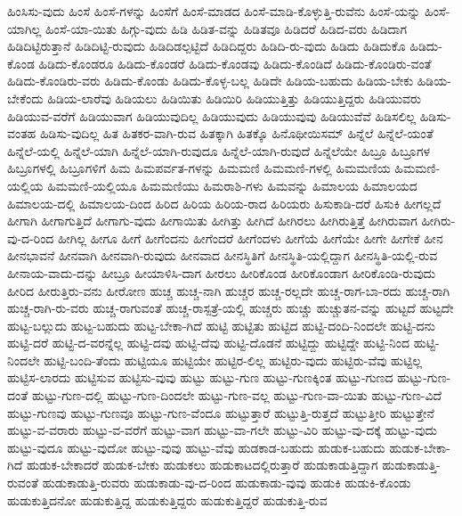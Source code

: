 {ಹಿಂಸಿಸು-ವುದು
ಹಿಂಸೆ
ಹಿಂಸೆ-ಗಳನ್ನು
ಹಿಂಸೆಗೆ
ಹಿಂಸೆ-ಮಾಡದ
ಹಿಂಸೆ-ಮಾಡಿ-ಕೊಳ್ಳುತ್ತಿ-ರುವೆನು
ಹಿಂಸೆ-ಯನ್ನು
ಹಿಂಸೆ-ಯಾಗಿಲ್ಲ
ಹಿಂಸೆ-ಯಾ-ಯಿತು
ಹಿಗ್ಗು-ವುದು
ಹಿಡಿ
ಹಿಡಿತ-ವನ್ನು
ಹಿಡಿತವೂ
ಹಿಡಿದರೆ
ಹಿಡಿದ-ವರು
ಹಿಡಿದಾಗ
ಹಿಡಿದಿಟ್ಟಿರುತ್ತಾನೆ
ಹಿಡಿದಿಟ್ಟಿ-ರುವುದು
ಹಿಡಿದಿಡಲ್ಪಟ್ಟಿದೆ
ಹಿಡಿದಿದ್ದರು
ಹಿಡಿದಿ-ರು-ವುದು
ಹಿಡಿದು
ಹಿಡಿದುಕೊ
ಹಿಡಿದು-ಕೊಂಡ
ಹಿಡಿದು-ಕೊಂಡರೂ
ಹಿಡಿದು-ಕೊಂಡರೆ
ಹಿಡಿದು-ಕೊಂಡವು
ಹಿಡಿದು-ಕೊಂಡಿದೆ
ಹಿಡಿದು-ಕೊಂಡಿರು-ವಂತೆ
ಹಿಡಿದು-ಕೊಂಡಿರು-ವರು
ಹಿಡಿದು-ಕೊಂಡು
ಹಿಡಿದು-ಕೊಳ್ಳ-ಬಲ್ಲ
ಹಿಡಿದೇ
ಹಿಡಿಯ-ಬಹುದು
ಹಿಡಿಯ-ಬೇಕು
ಹಿಡಿಯ-ಬೇಕೆಂದು
ಹಿಡಿಯ-ಲಾರೆವು
ಹಿಡಿಯಲು
ಹಿಡಿಯಿತು
ಹಿಡಿಯಿರಿ
ಹಿಡಿಯುತ್ತಿತ್ತು
ಹಿಡಿಯುತ್ತಿದ್ದರು
ಹಿಡಿಯುವರು
ಹಿಡಿಯುವ-ವರೆಗೆ
ಹಿಡಿಯುವಾಗ
ಹಿಡಿಯುವುದಿಲ್ಲ
ಹಿಡಿಯುವುದು
ಹಿಡಿಯುವುವು
ಹಿಡಿಯುವೆವೆ
ಹಿಡಿಸಲಿಲ್ಲ
ಹಿಡಿಸು-ವಂತಹ
ಹಿಡಿಸು-ವುದಿಲ್ಲ
ಹಿತ
ಹಿತಕರ-ವಾಗಿ-ರುವ
ಹಿತಕ್ಕಾಗಿ
ಹಿತಕ್ಕೊ
ಹಿನೊಥೀಯಿಸಮ್
ಹಿನ್ನೆಲೆ
ಹಿನ್ನೆಲೆ-ಯಂತೆ
ಹಿನ್ನೆಲೆ-ಯಲ್ಲಿ
ಹಿನ್ನೆಲೆ-ಯಾಗಿ
ಹಿನ್ನೆಲೆ-ಯಾಗಿ-ರುವುದೂ
ಹಿನ್ನೆಲೆ-ಯಾಗಿ-ರುವುದೆ
ಹಿನ್ನೆಲೆಯೇ
ಹಿಬ್ರೂ
ಹಿಬ್ರೂಗಳ
ಹಿಬ್ರೂಗಳಲ್ಲಿ
ಹಿಬ್ರೂಗಳಿಗೆ
ಹಿಮ
ಹಿಮಪರ್ವತ-ಗಳನ್ನು
ಹಿಮಮಣಿ
ಹಿಮಮಣಿ-ಗಳಲ್ಲಿ
ಹಿಮಮಣಿಯ
ಹಿಮಮಣಿ-ಯಲ್ಲಿಯ
ಹಿಮಮಣಿ-ಯಲ್ಲಿಯೂ
ಹಿಮಮಣಿಯು
ಹಿಮರಾಶಿ-ಗಳು
ಹಿಮವನ್ನು
ಹಿಮಾಲಯ
ಹಿಮಾಲಯದ
ಹಿಮಾಲಯ-ದಲ್ಲಿ
ಹಿಮಾಲಯ-ದಿಂದ
ಹಿರಿದ
ಹಿರಿಯ
ಹಿರಿಯ-ರಾದ
ಹಿರಿಯರು
ಹಿಸುಕಾಡಿ-ದರೆ
ಹಿಸುಕಿ
ಹೀಗಲ್ಲದೆ
ಹೀಗಾಗಿ
ಹೀಗಾಗುತ್ತಿದೆ
ಹೀಗಾಗು-ವುದು
ಹೀಗಾಯಿತು
ಹೀಗಿತ್ತು
ಹೀಗಿದೆ
ಹೀಗಿರಲು
ಹೀಗಿರುತ್ತಿತ್ತೆ
ಹೀಗಿರುವಾಗ
ಹೀಗಿರು-ವು-ದ-ರಿಂದ
ಹೀಗಿಲ್ಲ
ಹೀಗೂ
ಹೀಗೆ
ಹೀಗೆಂದನು
ಹೀಗೆಂದರೆ
ಹೀಗೆಂದಳು
ಹೀಗೆಯೆ
ಹೀಗೆಯೇ
ಹೀಗೇ
ಹೀಗೇಕೆ
ಹೀನ
ಹೀನಭಾವನೆ
ಹೀನವಾಗಿ
ಹೀನವಾಗಿ-ರುವುದು
ಹೀನವಾದ
ಹೀನಸ್ಥಿತಿಗೆ
ಹೀನಸ್ಥಿತಿ-ಯಲ್ಲಿದ್ದಾಗ
ಹೀನಸ್ಥಿತಿ-ಯಲ್ಲಿ-ರುವ
ಹೀನಾಯ-ವಾದು-ದನ್ನು
ಹೀಬ್ರೂ
ಹೀಯಾಳಿಸಿ-ದಾಗ
ಹೀರಲು
ಹೀರಿಕೊಂಡ
ಹೀರಿಕೊಂಡಾಗ
ಹೀರಿಕೊಂಡಿ-ರುವುದು
ಹೀರಿದ
ಹೀರುತ್ತಿರು-ವನು
ಹೀರೋಣ
ಹುಚ್ಚ
ಹುಚ್ಚ-ನಾಗಿ
ಹುಚ್ಚರ
ಹುಚ್ಚ-ರಲ್ಲದೇ
ಹುಚ್ಚ-ರಾಗ-ಬಾ-ರದು
ಹುಚ್ಚ-ರಾಗಿ
ಹುಚ್ಚ-ರಾಗಿ-ರು-ವರು
ಹುಚ್ಚ-ರಾಗುವಂತೆ
ಹುಚ್ಚ-ರಾಸ್ಪತ್ರೆ-ಯಲ್ಲಿ
ಹುಚ್ಚರು
ಹುಚ್ಚು
ಹುಚ್ಚುತನ-ವನ್ನು
ಹುಟ್ಟದೆ
ಹುಟ್ಟದೇ
ಹುಟ್ಟ-ಬಲ್ಲುದು
ಹುಟ್ಟ-ಬಹುದು
ಹುಟ್ಟ-ಬೇಕಾ-ಗಿದೆ
ಹುಟ್ಟಿ
ಹುಟ್ಟಿತು
ಹುಟ್ಟಿದ
ಹುಟ್ಟಿ-ದಂದಿ-ನಿಂದಲೇ
ಹುಟ್ಟಿ-ದನು
ಹುಟ್ಟಿ-ದರೆ
ಹುಟ್ಟಿ-ದ-ವರನ್ನೆಲ್ಲ
ಹುಟ್ಟಿ-ದವು
ಹುಟ್ಟಿ-ದೆವು
ಹುಟ್ಟಿ-ದೊಡನೆ
ಹುಟ್ಟಿದ್ದು
ಹುಟ್ಟಿದ್ದೇ
ಹುಟ್ಟಿ-ನಿಂದ
ಹುಟ್ಟಿ-ನಿಂದಲೇ
ಹುಟ್ಟಿ-ಬಂದಿ-ತೆಂದು
ಹುಟ್ಟಿಯೂ
ಹುಟ್ಟಿಯೇ
ಹುಟ್ಟಿರ-ಲಿಲ್ಲ
ಹುಟ್ಟಿರು-ವುದು
ಹುಟ್ಟಿರು-ವೆವು
ಹುಟ್ಟಿಲ್ಲ
ಹುಟ್ಟಿಸ-ಲಾರದು
ಹುಟ್ಟಿಸುವ
ಹುಟ್ಟಿಸು-ವುವು
ಹುಟ್ಟು
ಹುಟ್ಟು-ಗುಣ
ಹುಟ್ಟು-ಗುಣಕ್ಕಿಂತ
ಹುಟ್ಟು-ಗುಣದ
ಹುಟ್ಟು-ಗುಣ-ದಂತೆ
ಹುಟ್ಟು-ಗುಣ-ದಲ್ಲಿ
ಹುಟ್ಟು-ಗುಣ-ದಿಂದಲೇ
ಹುಟ್ಟು-ಗುಣ-ವಲ್ಲ
ಹುಟ್ಟು-ಗುಣ-ವಾ-ಯಿತು
ಹುಟ್ಟು-ಗುಣ-ವಿದೆ
ಹುಟ್ಟು-ಗುಣವು
ಹುಟ್ಟು-ಗುಣವೂ
ಹುಟ್ಟು-ಗುಣ-ವೆಂದೂ
ಹುಟ್ಟುತ್ತಾರೆ
ಹುಟ್ಟುತ್ತಿ-ರುತ್ತದೆ
ಹುಟ್ಟುತ್ತೀರಿ
ಹುಟ್ಟುತ್ತೇನೆ
ಹುಟ್ಟು-ವ-ವರಾರು
ಹುಟ್ಟು-ವ-ವರೆಗೆ
ಹುಟ್ಟು-ವಾಗ
ಹುಟ್ಟು-ವಾ-ಗಲೇ
ಹುಟ್ಟು-ವಿರಿ
ಹುಟ್ಟು-ವು-ದಕ್ಕೆ
ಹುಟ್ಟು-ವುದು
ಹುಟ್ಟು-ವುದೂ
ಹುಟ್ಟು-ವುದೋ
ಹುಟ್ಟು-ವುವು
ಹುಟ್ಟು-ವೆವು
ಹುಡಕಾಡ-ಬಹುದು
ಹುಡುಕ-ಬಹುದು
ಹುಡುಕ-ಬೇಕಾ-ಗಿದೆ
ಹುಡುಕ-ಬೇಕಾದರೆ
ಹುಡುಕ-ಬೇಕು
ಹುಡುಕಲು
ಹುಡುಕಾಟದಲ್ಲಿರುತ್ತಾರೆ
ಹುಡುಕಾಡುತ್ತಿದ್ದಾಗ
ಹುಡುಕಾಡುತ್ತಿ-ರುವಂತೆ
ಹುಡುಕಾಡುತ್ತಿ-ರುವರು
ಹುಡುಕಾಡು-ವು-ದ-ರಿಂದ
ಹುಡುಕಾಡು-ವುವು
ಹುಡುಕಿ
ಹುಡುಕಿ-ಕೊಂಡು
ಹುಡುಕುತ್ತಿದನೋ
ಹುಡುಕುತ್ತಿದ್ದ
ಹುಡುಕುತ್ತಿದ್ದರು
ಹುಡುಕುತ್ತಿದ್ದರೆ
ಹುಡುಕುತ್ತಿ-ರುವ
}
